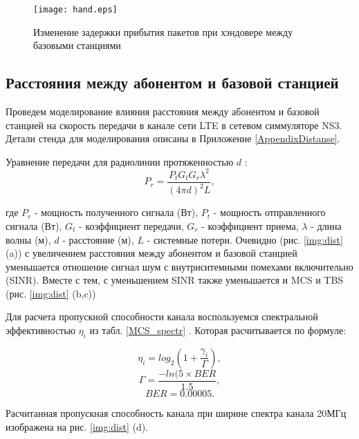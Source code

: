 \begin{figure} [h]
  \center
\texttt{[image: hand.eps]}
  \caption{Изменение задержки прибытия пакетов при хэндовере между базовыми станциями}
  \label{img:hand}
\end{figure}

\subsection{Расстояния между абонентом и базовой станцией}  \label{sect2_2_2}
Проведем моделирование влияния расстояния между абонентом и базовой станцией на скорость передачи в канале сети LTE в сетевом симмуляторе NS3. Детали стенда для моделирования описаны в Приложение \ref{AppendixDistanse}. 

Уравнение передачи для радиолинии протяженностью $d$ \cite{Friis}:
\begin{equation}\label{eq:friisNew}
P_{r}=\frac{P_{t}G_{t}G_{r}\lambda^{2}}{(4\pi d)^{2}L},
\end{equation}

\noindent где $P_{r}$ - мощность полученного сигнала (Вт), $P_{t}$ - мощность отправленного сигнала (Вт), $G_{t}$ - коэффициент передачи, $G_{r}$ - коэффициент приема, $\lambda$ - длина волны (м), $d$ - расстояние (м), $L$ - системные потери. Очевидно (рис. \ref{img:dist} (a)) с увеличением расстояния между абонентом и базовой станцией уменьшается отношение сигнал шум с внутриситемными помехами включительно (SINR). Вместе с тем, с уменьшением SINR также уменьшается и MCS и TBS (рис. \ref{img:dist} (b,c))

Для расчета пропускной способности канала воспользуемся спектральной эффективностью $\eta_{i}$ из табл. \ref{MCS_spectr}  \cite{R1-081483}. Которая расчитывается по формуле:

\begin{equation}\label{eq:spectr1}
\eta_{i}=log_{2}(1+\frac{\gamma_{i}}{\Gamma}),
\end{equation}
\begin{equation}\label{eq:spectr2}
\Gamma=\frac{-ln(5\times BER}{1.5},
\end{equation}
\begin{equation}\label{eq:spectr3}
BER=0.00005.
\end{equation}

Расчитанная пропускная способность канала при ширине спектра канала  20МГц изображена на рис. \ref{img:dist} (d).

\clearpage

